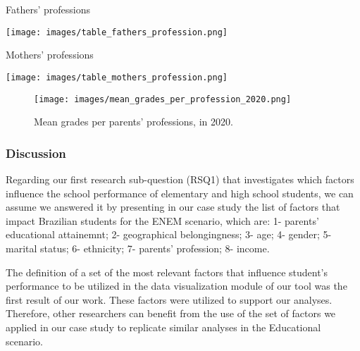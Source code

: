 \documentclass[12pt]{article}
\begin{document}
\begin{table}[ht]
\centering
\caption{Fathers' professions}
\label{tab:table_fathers_jobs}
\texttt{[image: images/table\_fathers\_profession.png]}
\end{table}

\begin{table}[ht]
\centering
\caption{Mothers' professions}
\label{tab:table_mothers_jobs}
\texttt{[image: images/table\_mothers\_profession.png]}
\end{table}

\begin{figure}[h!]
\centerline{\texttt{[image: images/mean\_grades\_per\_profession\_2020.png]}}
\caption{Mean grades per parents' professions, in 2020.} 
\label{profession}
\end{figure}


\subsubsection{Discussion}

Regarding our first research sub-question (RSQ1) that investigates which factors influence the school performance of elementary and high school
students, we can assume we answered it by presenting in our case study the list of factors that impact Brazilian students for the ENEM scenario, which are: 1- parents' educational attainemnt; 2- geographical belongingness; 3- age; 4- gender; 5- marital status; 6- ethnicity; 7- parents' profession; 8- income.

The definition of a set of the most relevant factors that influence student’s performance to be utilized in the data visualization module of our tool was the first result of our work. These factors were utilized to support our analyses.
Therefore, other researchers can benefit from the use of the set of factors we applied in our case study to replicate similar analyses in the Educational scenario. 

\end{document}
